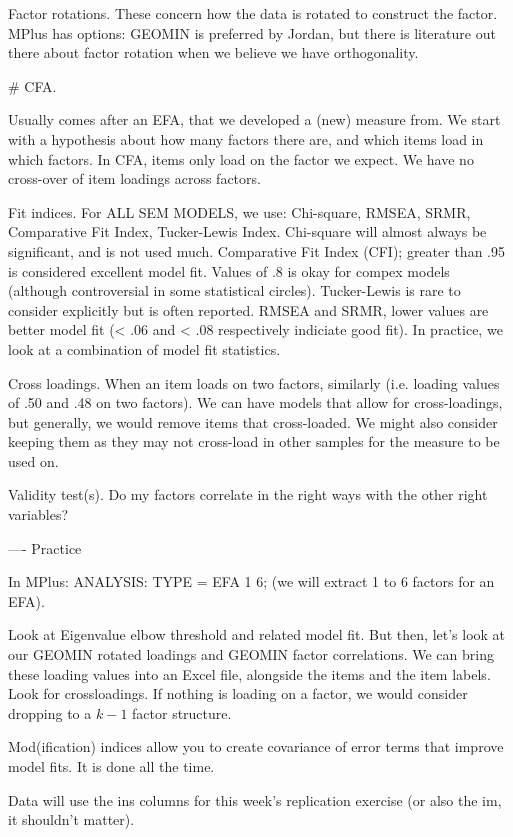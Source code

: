 \documentclass{article}
\begin{document}
Factor rotations.
These concern how the data is rotated to construct the factor.
MPlus has options: GEOMIN is preferred by Jordan, but there is literature out there about factor rotation when we believe we have orthogonality.

# CFA.

Usually comes after an EFA, that we developed a (new) measure from.
We start with a hypothesis about how many factors there are, and which items load in which factors.
In CFA, items only load on the factor we expect.
We have no cross-over of item loadings across factors.

Fit indices.
For ALL SEM MODELS, we use: Chi-square, RMSEA, SRMR, Comparative Fit Index, Tucker-Lewis Index.
Chi-square will almost always be significant, and is not used much.
Comparative Fit Index (CFI); greater than .95 is considered excellent model fit.
Values of .8 is okay for compex models (although controversial in some statistical circles).
Tucker-Lewis is rare to consider explicitly but is often reported.
RMSEA and SRMR, lower values are better model fit (< .06 and < .08 respectively indiciate good fit). 
In practice, we look at a combination of model fit statistics.

Cross loadings.
When an item loads on two factors, similarly (i.e. loading values of .50 and .48 on two factors).
We can have models that allow for cross-loadings, but generally, we would remove items that cross-loaded.
We might also consider keeping them as they may not cross-load in other samples for the measure to be used on.

Validity test(s).
Do my factors correlate in the right ways with the other right variables?

---- Practice

In MPlus: ANALYSIS: TYPE = EFA 1 6; (we will extract 1 to 6 factors for an EFA).

Look at Eigenvalue elbow threshold and related model fit.
But then, let's look at our GEOMIN rotated loadings and GEOMIN factor correlations.
We can bring these loading values into an Excel file, alongside the items and the item labels.
Look for crossloadings.
If nothing is loading on a factor, we would consider dropping to a $k-1$ factor structure.

Mod(ification) indices allow you to create covariance of error terms that improve model fits.
It is done all the time.

Data will use the ins columns for this week's replication exercise (or also the im, it shouldn't matter).
\end{document}
